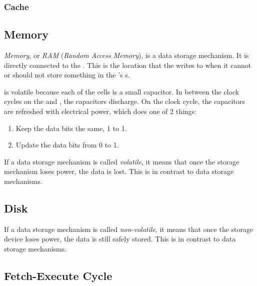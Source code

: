 \subsubsection{Cache}\label{subsubsec:CPU_Cache}

\subsection{Memory}\label{subsec:Memory}
\begin{definition}[Memory]\label{def:Memory}
  \emph{Memory}, or \emph{RAM} (\emph{Random Access Memory}), is a  data storage mechanism.
  It is directly connected to the .
  This is the location that the  writes to when it cannot or should not store something in the 's s.

  \begin{remark}[Volatility]
     is volatile because each of the cells is a small capacitor.
    In between the clock cycles on the  and , the capacitors discharge.
    On the clock cycle, the capacitors are refreshed with electrical power, which does one of 2 things:
    \begin{enumerate}[noitemsep]
    \item Keep the data bits the same, 1 to 1.
    \item Update the data bits from 0 to 1.
    \end{enumerate}
  \end{remark}
\end{definition}

\begin{definition}[Volatile]\label{def:Volatile}
  If a data storage mechanism is called \emph{volatile}, it means that once the storage mechanism loses power, the data is lost.
  This is in contrast to  data storage mechanisms.
\end{definition}

\subsection{Disk}\label{subsec:Disk}
\begin{definition}\label{def:Non-Volatile}
  If a data storage mechanism is called \emph{non-volatile}, it means that once the storage device loses power, the data is still safely stored.
  This is in contrast to  data storage mechanisms.
\end{definition}

\subsection{Fetch-Execute Cycle}\label{subsec:Fetch_Execute_Cycle}
